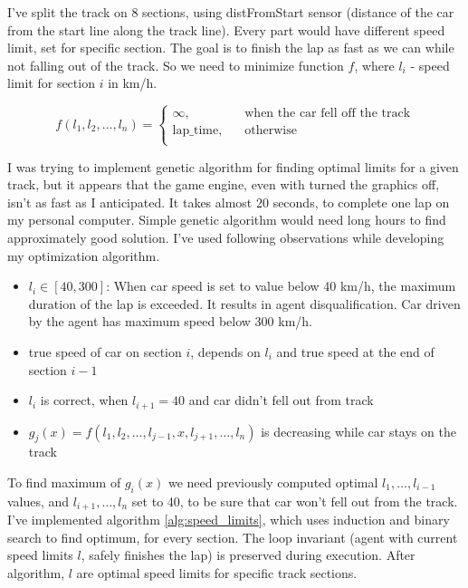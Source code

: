 \documentclass[declaration,shortabstract,english,inz]{iithesis}
\begin{document}
I've split the track on 8 sections, using distFromStart sensor (distance of the car from the start line along the track line).
Every part would have different speed limit, set for specific section.
The goal is to finish the lap as fast as we can while not falling out of the track.
So we need to minimize function $f$, where $l_i$ - speed limit for section $i$ in km/h.

$$ f(l_1, l_2, \dots, l_n ) =  \begin{cases}
    \infty, &\quad \text{when the car fell off the track}\\
    \text{lap\_time}, &\quad \text{otherwise} \\
  \end{cases}
 $$

I was trying to implement genetic algorithm for finding optimal limits for a given track, but it appears that the game engine, even with turned the graphics off, isn't as fast as I anticipated.
It takes almost 20 seconds, to complete one lap on my personal computer.
Simple genetic algorithm would need long hours to find approximately good solution.
I've used following observations while developing my optimization algorithm.

\begin{itemize}
    \item  $l_i \in [40, 300]$: When car speed is set to value below 40 km/h, the maximum duration of the lap is exceeded. It results in agent disqualification. Car driven by the agent has maximum speed below 300 km/h.
    \item  true speed of car on section $i$, depends on $l_i$ and true speed at the end of section $i-1$
    \item
    $l_i$ is correct, when $l_{i+1} = 40$ and car didn't fell out from track
    \item  $g_j(x) = f(l_1,l_2, \dots,l_{j-1}, x, l_{j+1}, \dots, l_n)$ is decreasing while car stays on the track
    
\end{itemize}


To find maximum of $g_i(x)$ we need previously computed optimal $l_1, \dots, l_{i-1}$ values, and $l_{i+1}, \dots, l_n$ set to 40, to be sure that car won't fell out from the track. 
I've implemented algorithm \ref{alg:speed_limits}, which uses induction and binary search to find optimum, for every section. 
The loop invariant (agent with current speed limits $l$, safely finishes the lap) is preserved during execution.
After algorithm, $l$ are optimal speed limits for specific track sections.
\end{document}
